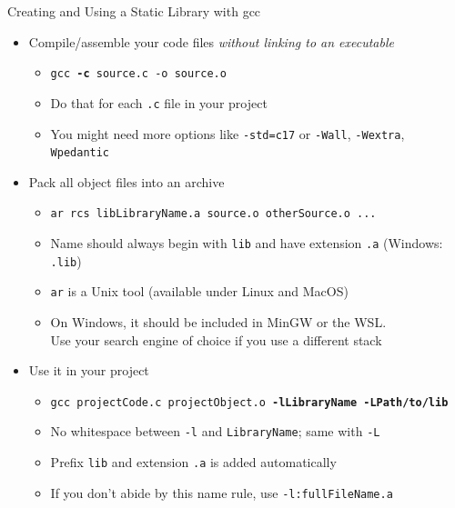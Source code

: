 \begin{frame}{Creating and Using a Static Library with gcc}
%
\begin{itemize}
\item Compile/assemble your code files \emph{without linking to an executable}
	\begin{itemize}
	\item \texttt{gcc \textbf{-c} source.c -o source.o}
	\item Do that for each \texttt{.c} file in your project
	\item You might need more options like \texttt{-std=c17} or \texttt{-Wall}, \texttt{-Wextra}, \texttt{Wpedantic}
	\end{itemize}
\item Pack all object files into an archive
	\begin{itemize}
	\item \texttt{ar rcs libLibraryName.a source.o otherSource.o ...}
	\item Name should always begin with \texttt{lib} and have extension \texttt{.a} (Windows: \texttt{.lib})
	\item \texttt{ar} is a Unix tool (\thus available under Linux and MacOS)
	\item On Windows, it should be included in MinGW or the WSL.\\
		Use your search engine of choice if you use a different stack
	\end{itemize}
\item Use it in your project
	\begin{itemize}
	\item \texttt{gcc projectCode.c projectObject.o \textbf{-lLibraryName -LPath/to/lib}}
	\item No whitespace between \texttt{-l} and \texttt{LibraryName}; same with \texttt{-L}
	\item Prefix \texttt{lib} and extension \texttt{.a} is added automatically
	\item If you don't abide by this name rule, use \texttt{-l:fullFileName.a}
	\end{itemize}
\end{itemize}
%
\end{frame}


